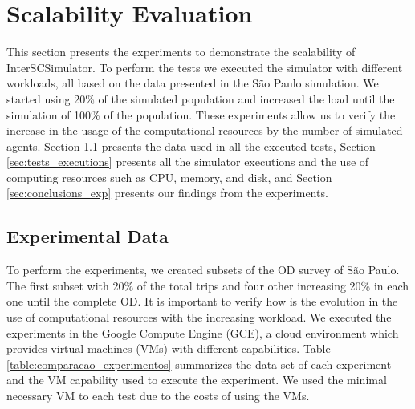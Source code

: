 \chapter{Scalability Evaluation}
\label{cap:avaliacao}

This section presents the experiments to demonstrate the scalability of InterSCSimulator. To perform the tests we executed the simulator with different workloads, all based on the data presented in the S\~ao Paulo simulation. We started using 20\% of the simulated population and increased the load until the simulation of 100\% of the population. These experiments allow us to verify the increase in the usage of the computational resources by the number of simulated agents. Section \ref{sec:data_exp} presents the data used in all the executed tests, Section \ref{sec:tests_executions} presents all the simulator executions and the use of computing resources such as CPU, memory, and disk, and Section \ref{sec:conclusions_exp} presents our findings from the experiments.

\section{Experimental Data}
\label{sec:data_exp}

To perform the experiments, we created subsets of the OD survey of S\~ao Paulo. The first subset with 20\% of the total trips and four other increasing 20\% in each one until the complete OD. It is important to verify how is the evolution in the use of computational resources with the increasing workload. We executed the experiments in the Google Compute Engine (GCE), a cloud environment which provides virtual machines (VMs) with different capabilities. Table \ref{table:comparacao_experimentos} summarizes the data set of each experiment and the VM capability used to execute the experiment. We used the minimal necessary VM to each test due to the costs of using the VMs. 

